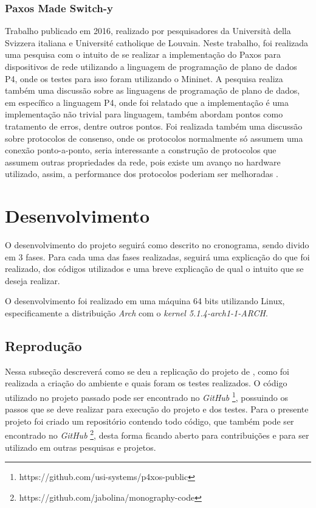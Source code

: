 \documentclass[
    12pt,
    openright, 
    oneside,
    a4paper,
    french,
    english,
    brazil
    ]{facom-ufu-abntex2}
\theoremstyle{definition}
\begin{document}
\subsection{Paxos Made Switch-y}
Trabalho publicado em 2016, realizado por pesquisadores da Università della Svizzera italiana
e Université catholique de Louvain. Neste trabalho, foi realizada uma pesquisa com o intuito
de se realizar a implementação do Paxos para dispositivos de rede utilizando a linguagem
de programação de plano de dados P4, onde os testes para isso foram utilizando o Mininet. 
A pesquisa realiza também uma discussão sobre as linguagens de programação de plano de dados,
em específico a linguagem P4, onde foi relatado que a implementação é uma
implementação não trivial para linguagem, também abordam pontos como tratamento de erros,
dentre outros pontos. Foi realizada também uma discussão sobre protocolos de consenso,
onde os protocolos normalmente só assumem uma conexão ponto-a-ponto, seria interessante a
construção de protocolos que assumem outras propriedades da rede, pois existe um avanço
no hardware utilizado, assim, a performance dos protocolos poderiam ser melhoradas 
\cite{dang2016paxos}.

\chapter{Desenvolvimento}
O desenvolvimento do projeto seguirá como descrito no cronograma, sendo divido em 
3 fases. Para cada uma das fases realizadas, seguirá uma explicação do que foi realizado,
dos códigos utilizados e uma breve explicação de qual o intuito que se deseja realizar.

O desenvolvimento foi realizado em uma máquina 64 bits utilizando Linux, especificamente a 
distribuição \emph{Arch} com o \emph{kernel 5.1.4-arch1-1-ARCH}.

\section{Reprodução}
Nessa subseção descreverá como se deu a replicação do projeto de \cite{dang2016paxos}, como foi realizada 
a criação do ambiente e quais foram os testes
realizados. O código utilizado no projeto passado pode ser encontrado no \emph{GitHub}
\footnote{https://github.com/usi-systems/p4xos-public}, possuindo os passos que
se deve realizar para execução do projeto e dos testes. Para o presente projeto foi 
criado um repositório contendo todo código, que também pode ser encontrado no \emph{GitHub}
\footnote{https://github.com/jabolina/monography-code}, desta forma ficando aberto
para contribuições e para ser utilizado em outras pesquisas e projetos.
\end{document}
